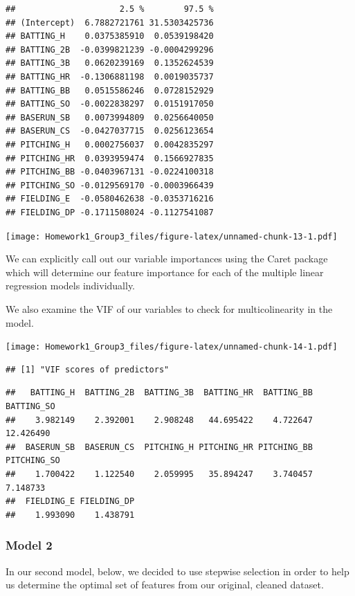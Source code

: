 \documentclass[
]{article}
\begin{document}
\begin{verbatim}
##                     2.5 %        97.5 %
## (Intercept)  6.7882721761 31.5303425736
## BATTING_H    0.0375385910  0.0539198420
## BATTING_2B  -0.0399821239 -0.0004299296
## BATTING_3B   0.0620239169  0.1352624539
## BATTING_HR  -0.1306881198  0.0019035737
## BATTING_BB   0.0515586246  0.0728152929
## BATTING_SO  -0.0022838297  0.0151917050
## BASERUN_SB   0.0073994809  0.0256640050
## BASERUN_CS  -0.0427037715  0.0256123654
## PITCHING_H   0.0002756037  0.0042835297
## PITCHING_HR  0.0393959474  0.1566927835
## PITCHING_BB -0.0403967131 -0.0224100318
## PITCHING_SO -0.0129569170 -0.0003966439
## FIELDING_E  -0.0580462638 -0.0353716216
## FIELDING_DP -0.1711508024 -0.1127541087
\end{verbatim}

\texttt{[image: Homework1\_Group3\_files/figure-latex/unnamed-chunk-13-1.pdf]}

We can explicitly call out our variable importances using the Caret
package which will determine our feature importance for each of the
multiple linear regression models individually.

We also examine the VIF of our variables to check for multicolinearity
in the model.

\texttt{[image: Homework1\_Group3\_files/figure-latex/unnamed-chunk-14-1.pdf]}

\begin{verbatim}
## [1] "VIF scores of predictors"
\end{verbatim}

\begin{verbatim}
##   BATTING_H  BATTING_2B  BATTING_3B  BATTING_HR  BATTING_BB  BATTING_SO 
##    3.982149    2.392001    2.908248   44.695422    4.722647   12.426490 
##  BASERUN_SB  BASERUN_CS  PITCHING_H PITCHING_HR PITCHING_BB PITCHING_SO 
##    1.700422    1.122540    2.059995   35.894247    3.740457    7.148733 
##  FIELDING_E FIELDING_DP 
##    1.993090    1.438791
\end{verbatim}

\hypertarget{model-2}{%
\subsubsection{Model 2}\label{model-2}}

In our second model, below, we decided to use stepwise selection in
order to help us determine the optimal set of features from our
original, cleaned dataset.
\end{document}
